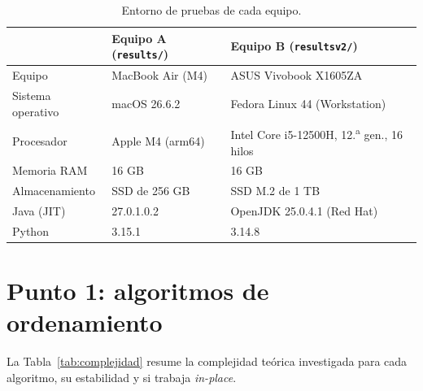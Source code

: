 \documentclass[11pt,a4paper]{article}
\newcommand{\code}[1]{\texttt{#1}}
\begin{document}
\begin{table}[htbp]
\centering
\caption{Entorno de pruebas de cada equipo.}\label{tab:entorno}
{\small
\begin{tabular}{lll}
\toprule
 & Equipo A (\code{results/}) & Equipo B (\code{resultsv2/}) \\
\midrule
Equipo & MacBook Air (M4) & ASUS Vivobook X1605ZA \\
Sistema operativo & macOS 26.6.2 & Fedora Linux 44 (Workstation) \\
Procesador & Apple M4 (arm64) & Intel Core i5-12500H, 12.\textsuperscript{a} gen., 16 hilos \\
Memoria RAM & 16 GB & 16 GB \\
Almacenamiento & SSD de 256 GB & SSD M.2 de 1 TB \\
Java (JIT) & 27.0.1.0.2 & OpenJDK 25.0.4.1 (Red Hat) \\
Python & 3.15.1 & 3.14.8 \\
\bottomrule
\end{tabular}}
\end{table}

\section{Punto 1: algoritmos de ordenamiento}\label{sec:p1}

La Tabla~\ref{tab:complejidad} resume la complejidad te\'orica investigada para cada algoritmo, su estabilidad y
si trabaja \emph{in-place}.

\begin{table}[htbp]
\centering
\caption{Complejidad te\'orica, estabilidad y uso de memoria ($n$ elementos, $d=8$ d\'igitos, $b=10$ base,
$k$ cubetas). \emph{Estable}: conserva el orden relativo de claves iguales. \emph{In-place}: usa memoria
auxiliar $O(1)$ (o $O(\log n)$ de pila).}\label{tab:complejidad}
\end{table}
\end{document}
